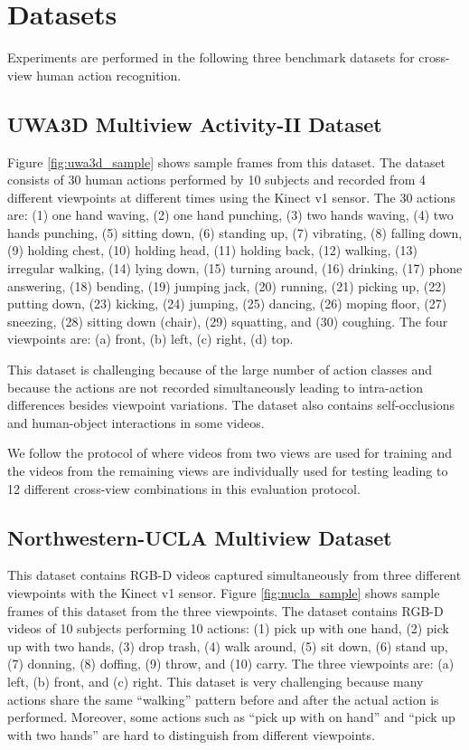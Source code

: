 \documentclass[twocolumn]{svjour3}          \smartqed  \usepackage{graphicx}
\begin{document}
\section{Datasets}

Experiments are performed in the following three benchmark datasets for cross-view human action recognition.

\subsection{UWA3D Multiview Activity-II Dataset}

Figure \ref{fig:uwa3d_sample} shows sample frames from this dataset. The dataset \citep{HOPC2016PAMI} consists of 30 human actions performed by 10 subjects and recorded from 4 different viewpoints at different times using the Kinect v1 sensor. The 30 actions are: (1) one hand waving, (2) one hand punching, (3) two hands waving, (4) two hands punching, (5) sitting down, (6) standing up, (7) vibrating, (8) falling down, (9) holding chest, (10) holding head, (11) holding back, (12) walking, (13) irregular walking, (14) lying down, (15) turning around, (16) drinking, (17) phone answering, (18) bending, (19) jumping jack, (20) running, (21) picking up, (22) putting down, (23) kicking, (24) jumping, (25) dancing, (26) moping floor, (27) sneezing, (28) sitting down (chair), (29) squatting, and (30) coughing. The four viewpoints are: (a) front, (b) left, (c) right, (d) top. 



This dataset is challenging because of the large number of action classes and because the actions are not recorded simultaneously leading to intra-action differences besides viewpoint variations. The dataset also contains self-occlusions and human-object interactions in some videos. 

We follow the protocol of \citep{HOPC2016PAMI} where videos from two views are used for training and the videos from the remaining views are individually used for testing leading to 12 different cross-view combinations in this evaluation protocol.


\subsection{Northwestern-UCLA Multiview Dataset}
This dataset \citep{AOG} contains RGB-D videos captured simultaneously from three different viewpoints with the Kinect v1 sensor. Figure \ref{fig:nucla_sample} shows sample frames of this dataset from the three viewpoints. The dataset contains RGB-D videos of 10 subjects performing 10 actions: (1) pick up with one hand, (2) pick up with two hands, (3) drop trash, (4) walk around, (5) sit down, (6) stand up, (7) donning, (8) doffing, (9) throw, and (10) carry. The three viewpoints are: (a) left, (b) front, and (c) right.  This dataset is very challenging because many actions share the same ``walking'' pattern before and after the actual action is performed. Moreover, some actions such as ``pick up with on hand'' and ``pick up with two hands'' are hard to distinguish from different viewpoints. 
\end{document}

